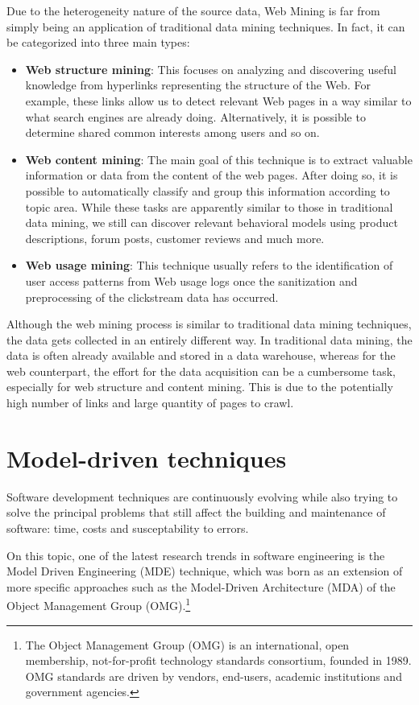 Due to the heterogeneity nature of the source data, Web Mining is far from simply being an application of traditional data mining techniques. In fact, it can be categorized into three main types:

\begin{itemize}
  \item \textbf{Web structure mining}:  This focuses on analyzing and discovering useful knowledge from hyperlinks representing the structure of the Web. For example, these links allow us to detect relevant Web pages in a way similar to what search engines are already doing. Alternatively, it is possible to determine shared common interests among users and so on.
  \item \textbf{Web content mining}: The main goal of this technique is to extract valuable information or data from the content of the web pages. After doing so, it is possible to automatically classify and group this information according to topic area. While these tasks are apparently similar to those in traditional data mining, we still can discover relevant behavioral models using product descriptions, forum posts, customer reviews and much more.
  \item \textbf{Web usage mining}: This technique usually refers to the identification of user access patterns from Web usage logs once the sanitization and preprocessing of the clickstream data has occurred.
\end{itemize} 



Although the web mining process is similar to traditional data mining techniques, the data gets collected in an entirely different way. In traditional data mining, the data is often already available and stored in a data warehouse, whereas for the web counterpart, the effort for the data acquisition can be a cumbersome task, especially for web structure and content mining. This is due to the potentially high number of links and large quantity of pages to crawl.

\section{Model-driven techniques}
\label{model-driven-techniques}
Software development techniques are continuously evolving while also trying to solve the principal problems that still affect the building and maintenance of software: time, costs and susceptability to errors.

On this topic, one of the latest research trends in software engineering is the Model Driven Engineering (MDE) technique, which was born as an extension of more specific approaches such as the Model-Driven Architecture (MDA) of the Object Management Group (OMG).\footnote{The Object Management Group (OMG) is an international, open membership, not-for-profit technology standards consortium, founded in 1989. OMG standards are driven by vendors, end-users, academic institutions and government agencies. } 

